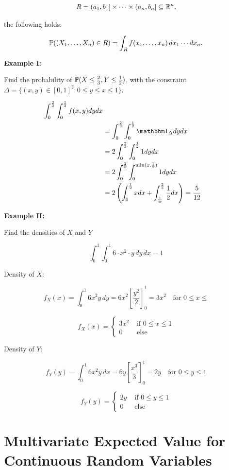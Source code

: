 \[
    R = (a_1, b_1] \times \cdots \times (a_n, b_n] \subseteq \mathbb{R}^n,
\]

the following holds:

\[
    \mathbb{P}((X_1, \ldots, X_n) \in R)
    = \int_R f(x_1, \ldots, x_n) \, dx_1 \cdots dx_n.
\]

\textbf{Example I:}

Find the probability of \(\mathbb{P}(X \le \frac{2}{3}, Y \le \frac{1}{2})\), with
the constraint \(\Delta = \{(x,y) \in [0,1]^2 : 0 \le y \le x \le 1 \}\).

\begin{align*}
    \int_{0}^{\frac{2}{3}} \int_{0}^{\frac{1}{2}} f(x,y) dy dx \\
    &= \int_{0}^{\frac{2}{3}} \int_{0}^{\frac{1}{2}} \ind_{\Delta} dy dx \\
    &= 2\int_{0}^{\frac{2}{3}} \int_{0}^{\frac{1}{2}} 1 dy dx \\
    &= 2\int_{0}^{\frac{2}{3}} \int_{0}^{\min (x, \frac{1}{2})} 1 dy dx \\
    &= 2\left(\int_{0}^{\frac{1}{2}} x dx  + \int_{\frac{1}{w}}^{\frac{2}{3}} \frac{1}{2} dx \right) = \frac{5}{12}
\end{align*}

\textbf{Example II:}

Find the densities of \(X\) and \(Y\)

\[
    \int_0^1 \int_0^1 6\cdot x^2 \cdot y \, dy \, dx = 1
\]

Density of \(X\):

\[
    f_X(x) = \int_0^1 6x^2 y \, dy = 6x^2 \left[\frac{y^2}{2}\right]_0^1 = 3x^2 \quad \text{for } 0 \leq x \leq
\]

\[
    f_X(x) = \begin{cases}
    3x^2 & \text{ if } 0 \leq x \leq 1 \\
    0 & \text{ else }
    \end{cases}
\]

Density of \(Y\):

\[
    f_Y(y) = \int_0^1 6x^2 y \, dx = 6y \left[\frac{x^3}{3}\right]_0^1 = 2y \quad \text{for } 0 \leq y \leq 1
\]

\[
    f_Y(y) = \begin{cases}
    2y & \text{ if } 0 \leq y \leq 1 \\
    0 & \text{ else}
    \end{cases}
\]

\section{Multivariate Expected Value for Continuous Random Variables}

